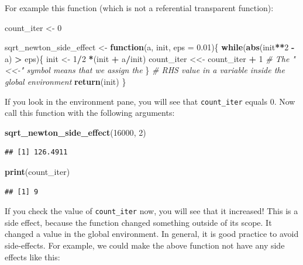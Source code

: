 \documentclass[]{gitbook}
\newenvironment{Shaded}{\begin{snugshade}}{\end{snugshade}}
\newcommand{\CommentTok}[1]{\textcolor[rgb]{0.56,0.35,0.01}{\textit{#1}}}
\newcommand{\ControlFlowTok}[1]{\textcolor[rgb]{0.13,0.29,0.53}{\textbf{#1}}}
\newcommand{\DataTypeTok}[1]{\textcolor[rgb]{0.13,0.29,0.53}{#1}}
\newcommand{\DecValTok}[1]{\textcolor[rgb]{0.00,0.00,0.81}{#1}}
\newcommand{\FloatTok}[1]{\textcolor[rgb]{0.00,0.00,0.81}{#1}}
\newcommand{\KeywordTok}[1]{\textcolor[rgb]{0.13,0.29,0.53}{\textbf{#1}}}
\newcommand{\NormalTok}[1]{#1}
\newcommand{\OperatorTok}[1]{\textcolor[rgb]{0.81,0.36,0.00}{\textbf{#1}}}
\newcommand{\StringTok}[1]{\textcolor[rgb]{0.31,0.60,0.02}{#1}}
\begin{document}
For example this function (which is not a referential transparent function):

\begin{Shaded}
\begin{Highlighting}[]
\NormalTok{count_iter <-}\StringTok{ }\DecValTok{0}

\NormalTok{sqrt_newton_side_effect <-}\StringTok{ }\ControlFlowTok{function}\NormalTok{(a, init, }\DataTypeTok{eps =} \FloatTok{0.01}\NormalTok{)\{}
    \ControlFlowTok{while}\NormalTok{(}\KeywordTok{abs}\NormalTok{(init}\OperatorTok{**}\DecValTok{2} \OperatorTok{-}\StringTok{ }\NormalTok{a) }\OperatorTok{>}\StringTok{ }\NormalTok{eps)\{}
\NormalTok{        init <-}\StringTok{ }\DecValTok{1}\OperatorTok{/}\DecValTok{2} \OperatorTok{*}\NormalTok{(init }\OperatorTok{+}\StringTok{ }\NormalTok{a}\OperatorTok{/}\NormalTok{init)}
\NormalTok{        count_iter <<-}\StringTok{ }\NormalTok{count_iter }\OperatorTok{+}\StringTok{ }\DecValTok{1} \CommentTok{# The "<<-" symbol means that we assign the}
\NormalTok{    \}                                 }\CommentTok{# RHS value in a variable inside the global environment}
    \KeywordTok{return}\NormalTok{(init)}
\NormalTok{\}}
\end{Highlighting}
\end{Shaded}

If you look in the environment pane, you will see that \texttt{count\_iter} equals 0. Now call this
function with the following arguments:

\begin{Shaded}
\begin{Highlighting}[]
\KeywordTok{sqrt_newton_side_effect}\NormalTok{(}\DecValTok{16000}\NormalTok{, }\DecValTok{2}\NormalTok{)}
\end{Highlighting}
\end{Shaded}

\begin{verbatim}
## [1] 126.4911
\end{verbatim}

\begin{Shaded}
\begin{Highlighting}[]
\KeywordTok{print}\NormalTok{(count_iter)}
\end{Highlighting}
\end{Shaded}

\begin{verbatim}
## [1] 9
\end{verbatim}

If you check the value of \texttt{count\_iter} now, you will see that it increased! This is a side effect,
because the function changed something outside of its scope. It changed a value in the global
environment. In general, it is good practice to avoid side-effects. For example, we could make the
above function not have any side effects like this:
\end{document}
